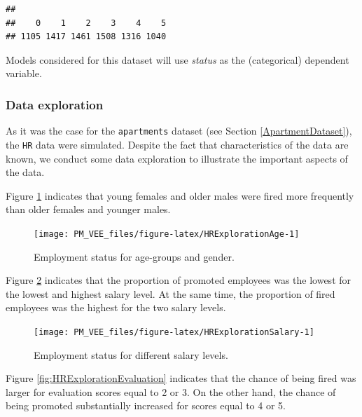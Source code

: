 \documentclass[12pt,]{krantz}
\theoremstyle{definition}
\theoremstyle{definition}
\theoremstyle{definition}
\theoremstyle{remark}
\begin{document}
\begin{verbatim}
## 
##    0    1    2    3    4    5 
## 1105 1417 1461 1508 1316 1040
\end{verbatim}

Models considered for this dataset will use \emph{status} as the
(categorical) dependent variable.

\hypertarget{exploration-HR}{%
\subsubsection{Data exploration}\label{exploration-HR}}

As it was the case for the \texttt{apartments} dataset (see Section
\ref{ApartmentDataset}), the \texttt{HR} data were simulated. Despite
the fact that characteristics of the data are known, we conduct some
data exploration to illustrate the important aspects of the data.

Figure \ref{fig:HRExplorationAge} indicates that young females and older
males were fired more frequently than older females and younger males.

\begin{figure}

{\centering \texttt{[image: PM\_VEE\_files/figure-latex/HRExplorationAge-1]} 

}

\caption{Employment status for age-groups and gender.}\label{fig:HRExplorationAge}
\end{figure}

Figure \ref{fig:HRExplorationSalary} indicates that the proportion of
promoted employees was the lowest for the lowest and highest salary
level. At the same time, the proportion of fired employees was the
highest for the two salary levels.

\begin{figure}

{\centering \texttt{[image: PM\_VEE\_files/figure-latex/HRExplorationSalary-1]} 

}

\caption{Employment status for different salary levels.}\label{fig:HRExplorationSalary}
\end{figure}

Figure \ref{fig:HRExplorationEvaluation} indicates that the chance of
being fired was larger for evaluation scores equal to 2 or 3. On the
other hand, the chance of being promoted substantially increased for
scores equal to 4 or 5.\\
\end{document}
